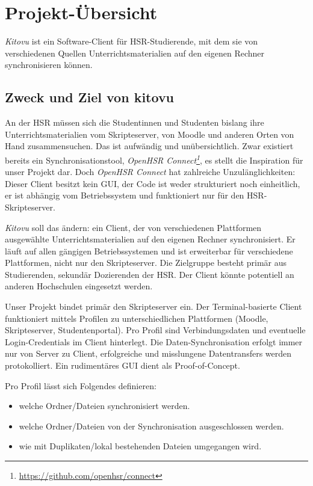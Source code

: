\documentclass[a4paper]{article}
\let\oldsection\section
\renewcommand\section{\clearpage\oldsection}
\newcommand{\tool}[2]{\emph{#1\footnote{\url{#2}}}}
\begin{document}
\section{Projekt-Übersicht}
\emph{Kitovu} ist ein Software-Client für HSR-Studierende, mit dem sie von verschiedenen Quellen Unterrichtsmaterialien auf den eigenen Rechner synchronisieren können.

\subsection{Zweck und Ziel von kitovu}
An der HSR müssen sich die Studentinnen und Studenten bislang ihre Unterrichtsmaterialien vom Skripteserver, von Moodle und anderen Orten von Hand zusammensuchen. Das ist aufwändig und unübersichtlich. Zwar existiert bereits ein Synchronisationstool, \tool{OpenHSR Connect}{https://github.com/openhsr/connect}, es stellt die Inspiration für unser Projekt dar. Doch \emph{OpenHSR Connect} hat zahlreiche Unzulänglichkeiten: Dieser Client besitzt kein GUI, der Code ist weder strukturiert noch einheitlich, er ist abhängig vom Betriebssystem und funktioniert nur für den HSR-Skripteserver.

\emph{Kitovu} soll das ändern: ein Client, der von verschiedenen Plattformen ausgewählte Unterrichtsmaterialien auf den eigenen Rechner synchronisiert. Er läuft auf allen gängigen Betriebssystemen und ist erweiterbar für verschiedene Plattformen, nicht nur den Skripteserver. Die Zielgruppe besteht primär aus Studierenden, sekundär Dozierenden der HSR. Der Client könnte potentiell an anderen Hochschulen eingesetzt werden.

Unser Projekt bindet primär den Skripteserver ein. Der Terminal-basierte Client funktioniert mittels Profilen zu unterschiedlichen Plattformen (Moodle, Skripteserver, Studentenportal). Pro Profil sind Verbindungsdaten und eventuelle Login-Credentials im Client hinterlegt. Die Daten-Synchronisation erfolgt immer nur von Server zu Client, erfolgreiche und misslungene Datentransfers werden protokolliert. Ein rudimentäres GUI dient als Proof-of-Concept.

Pro Profil lässt sich Folgendes definieren:

\begin{itemize}
  \item welche Ordner/Dateien synchronisiert werden.
  \item welche Ordner/Dateien von der Synchronisation ausgeschlossen werden.
  \item wie mit Duplikaten/lokal bestehenden Dateien umgegangen wird.
\end{itemize}
\end{document}
